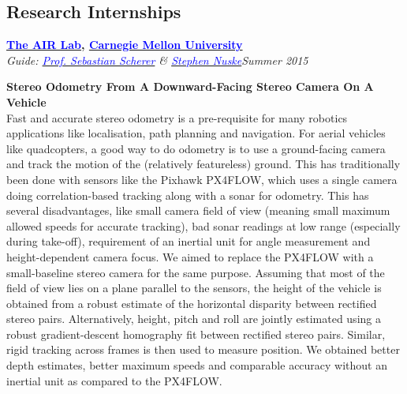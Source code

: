 \documentclass[margin,line]{res}
\newenvironment{list1}{
  \begin{list}{\ding{113}}{%
      \setlength{\itemsep}{0in}
      \setlength{\parsep}{0in} \setlength{\parskip}{0in}
      \setlength{\topsep}{0in} \setlength{\partopsep}{0in} 
      \setlength{\leftmargin}{0.17in}}}{\end{list}}
\begin{document}
\begin{resume}
\section{\sc Research Internships} 

{\bf  \href{http://theairlab.org/}{\textcolor{blue}{The AIR Lab}}, \href{http://www.cmu.edu/}{\textcolor{blue}{Carnegie Mellon University}}} \\
{\em Guide: \href{http://www.ri.cmu.edu/person.html?person_id=1397}{\textcolor{blue}{Prof. Sebastian Scherer}} \& \href{http://www.ri.cmu.edu/person.html?person_id=2128}{\textcolor{blue} {Stephen Nuske}}}\hfill\textit{Summer 2015}\\
\vspace*{-.13in}
\begin{list1}
\item[]\textbf{Stereo Odometry From A Downward-Facing Stereo Camera On A Vehicle} \\
Fast and accurate stereo odometry is a pre-requisite for many robotics applications like localisation, path planning and navigation. For aerial vehicles like quadcopters, a good way to do odometry is to use a ground-facing camera and track the motion of the (relatively featureless) ground. This has traditionally been done with sensors like the Pixhawk PX4FLOW, which uses a single camera doing correlation-based tracking along with a sonar for odometry. This has several disadvantages, like small camera field of view (meaning small maximum allowed speeds for accurate tracking), bad sonar readings at low range (especially during take-off), requirement of an inertial unit for angle measurement and height-dependent camera focus. We aimed to replace the PX4FLOW with a small-baseline stereo camera for the same purpose. Assuming that most of the field of view lies on a plane parallel to the sensors, the height of the vehicle is obtained from a robust estimate of the horizontal disparity between rectified stereo pairs. Alternatively, height, pitch and roll are jointly estimated using a robust gradient-descent homography fit between rectified stereo pairs. Similar, rigid tracking across frames is then used to measure position. We obtained better depth estimates, better maximum speeds and comparable accuracy without an inertial unit as compared to the PX4FLOW.
\end{list1}


\end{resume}
\end{document}
